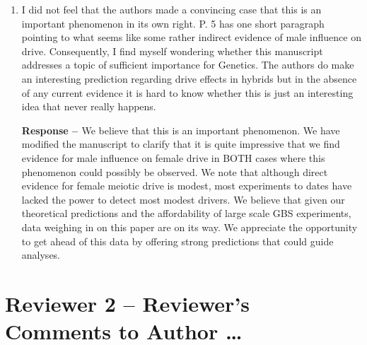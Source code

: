 \documentclass[12pt,letterpaper]{article}
\begin{document}
\begin{enumerate}
\item
\begin{singlespace}
I did not feel that the authors made a convincing case that this is an
important phenomenon in its own right.  P. 5 has one short paragraph pointing to
what seems like some rather indirect evidence of male influence on drive.
Consequently, I find myself wondering whether this manuscript addresses a topic
of sufficient importance for Genetics.  The authors do make an interesting
prediction regarding drive effects in hybrids but in the absence of any current
evidence it is hard to know whether this is just an interesting idea that never
really happens. \\
\end{singlespace}

\begin{singlespace}
	{\bf{Response -- }}  We believe that this is an important phenomenon. 
	We have modified the manuscript to clarify that it is  quite impressive that we find evidence
	for male influence on female drive in BOTH cases where this phenomenon could possibly be observed.
	We note that although direct evidence for female meiotic drive is modest, 
	most experiments to dates have lacked the power to detect most modest drivers. 
	We believe that given our theoretical predictions and the affordability of large scale GBS experiments,
	data weighing in on this paper are on its way. 
	We appreciate the opportunity to get ahead of this data by offering strong predictions that could guide analyses.
\end{singlespace}
\end{enumerate}

\newpage

\section*{Reviewer 2 -- Reviewer's Comments to Author \dots}
\end{document}
